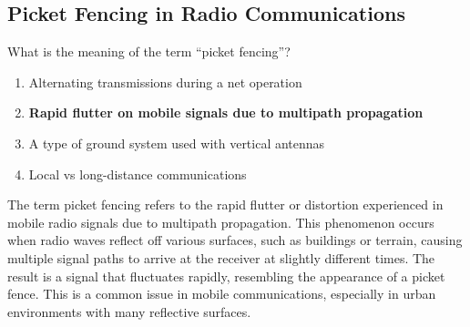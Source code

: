 \subsection{Picket Fencing in Radio Communications}
\label{T3A06}

\begin{tcolorbox}[colback=gray!10!white,colframe=black!75!black,title=T3A06]
What is the meaning of the term “picket fencing”?
\begin{enumerate}[noitemsep]
    \item Alternating transmissions during a net operation
    \item \textbf{Rapid flutter on mobile signals due to multipath propagation}
    \item A type of ground system used with vertical antennas
    \item Local vs long-distance communications
\end{enumerate}
\end{tcolorbox}

The term picket fencing refers to the rapid flutter or distortion experienced in mobile radio signals due to multipath propagation. This phenomenon occurs when radio waves reflect off various surfaces, such as buildings or terrain, causing multiple signal paths to arrive at the receiver at slightly different times. The result is a signal that fluctuates rapidly, resembling the appearance of a picket fence. This is a common issue in mobile communications, especially in urban environments with many reflective surfaces.